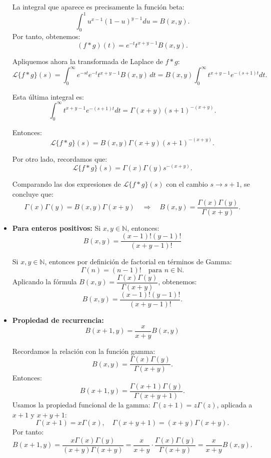 \begin{itemize}
\begin{myproof}
		      La integral que aparece es precisamente la función beta:
		      \[
			      \int_0^1 u^{x-1}(1 - u)^{y-1} du = B(x, y).
		      \]
		      Por tanto, obtenemos:
		      \[
			      (f * g)(t) = e^{-t} t^{x + y - 1} B(x, y).
		      \]

		      Apliquemos ahora la transformada de Laplace de \( f * g \):
		      \[
			      \mathcal{L}\{f * g\}(s) = \int_0^\infty e^{-st} e^{-t} t^{x + y - 1} B(x, y)\,dt = B(x, y) \int_0^\infty t^{x + y - 1} e^{-(s+1)t} dt.
		      \]

		      Esta última integral es:
		      \[
			      \int_0^\infty t^{x + y - 1} e^{-(s+1)t} dt = \Gamma(x + y)(s + 1)^{-(x + y)}.
		      \]

		      Entonces:
		      \[
			      \mathcal{L}\{f * g\}(s) = B(x, y)\Gamma(x + y)(s + 1)^{-(x + y)}.
		      \]

		      Por otro lado, recordamos que:
		      \[
			      \mathcal{L}\{f * g\}(s) = \Gamma(x)\Gamma(y)s^{-(x + y)}.
		      \]

		      Comparando las dos expresiones de \( \mathcal{L}\{f * g\}(s) \) con el cambio \( s \to s + 1 \), se concluye que:
		      \[
			      \Gamma(x)\Gamma(y) = B(x, y)\Gamma(x + y) \quad \Rightarrow \quad B(x, y) = \frac{\Gamma(x)\Gamma(y)}{\Gamma(x + y)}.
		      \]
	      \end{myproof}

	\item \textbf{Para enteros positivos:} Si \( x, y \in \mathbb{N} \), entonces:
	      \[
		      B(x, y) = \frac{(x-1)!(y-1)!}{(x + y - 1)!}
	      \]
	      \begin{myproof}
		      Si \( x, y \in \mathbb{N} \), entonces por definición de factorial en términos de Gamma:
		      \[
			      \Gamma(n) = (n-1)! \quad \text{para } n \in \mathbb{N}.
		      \]
		      Aplicando la fórmula \( B(x,y) = \dfrac{\Gamma(x)\Gamma(y)}{\Gamma(x+y)} \), obtenemos:
		      \[
			      B(x, y) = \frac{(x-1)!(y-1)!}{(x + y - 1)!}.
		      \]
	      \end{myproof}
	\item \textbf{Propiedad de recurrencia:}
	      \[
		      B(x+1, y) = \frac{x}{x + y} B(x, y)
	      \]
	      \begin{myproof}
		      Recordamos la relación con la función gamma:
		      \[
			      B(x, y) = \frac{\Gamma(x)\Gamma(y)}{\Gamma(x + y)}.
		      \]
		      Entonces:
		      \[
			      B(x+1, y) = \frac{\Gamma(x+1)\Gamma(y)}{\Gamma(x + y + 1)}.
		      \]
		      Usamos la propiedad funcional de la gamma: \( \Gamma(z+1) = z\Gamma(z) \), aplicada a \( x+1 \) y \( x + y + 1 \):
		      \[
			      \Gamma(x+1) = x\Gamma(x), \quad \Gamma(x + y + 1) = (x + y)\Gamma(x + y).
		      \]
		      Por tanto:
		      \[
			      B(x+1, y) = \frac{x \Gamma(x)\Gamma(y)}{(x + y)\Gamma(x + y)} = \frac{x}{x + y} \cdot \frac{\Gamma(x)\Gamma(y)}{\Gamma(x + y)} = \frac{x}{x + y} B(x, y).
		      \]
	      \end{myproof}

\end{itemize}

